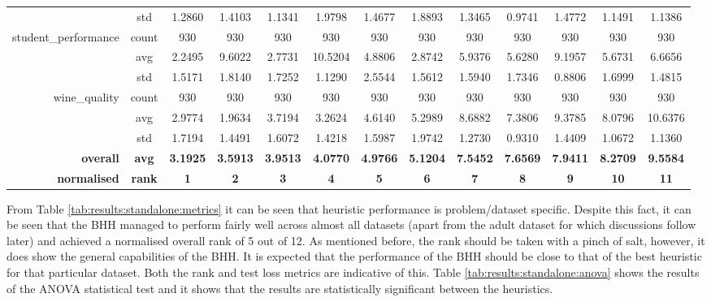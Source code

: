 \begin{table}[htbp]
{\begin{tabular}{rcccccccccccc}
          & std   & 1.2860 & 1.4103 & 1.1341 & 1.9798 & 1.4677 & 1.8893 & 1.3465 & 0.9741 & 1.4772 & 1.1491 & 1.1386 \\
    student\_performance & count & 930   & 930   & 930   & 930   & 930   & 930   & 930   & 930   & 930   & 930   & 930 \\
          & avg   & \cellcolor[rgb]{ .776,  .937,  .808}\textcolor[rgb]{ 0,  .38,  0}{2.2495} & 9.6022 & 2.7731 & 10.5204 & 4.8806 & 2.8742 & 5.9376 & 5.6280 & 9.1957 & 5.6731 & 6.6656 \\
          & std   & 1.5171 & 1.8140 & 1.7252 & 1.1290 & 2.5544 & 1.5612 & 1.5940 & 1.7346 & 0.8806 & 1.6999 & 1.4815 \\
    wine\_quality & count & 930   & 930   & 930   & 930   & 930   & 930   & 930   & 930   & 930   & 930   & 930 \\
          & avg   & 2.9774 & \cellcolor[rgb]{ .776,  .937,  .808}\textcolor[rgb]{ 0,  .38,  0}{1.9634} & 3.7194 & 3.2624 & 4.6140 & 5.2989 & 8.6882 & 7.3806 & 9.3785 & 8.0796 & 10.6376 \\
          & std   & 1.7194 & 1.4491 & 1.6072 & 1.4218 & 1.5987 & 1.9742 & 1.2730 & 0.9310 & 1.4409 & 1.0672 & 1.1360 \\
    \midrule
    \textbf{overall} & \textbf{avg} & \cellcolor[rgb]{ .776,  .937,  .808}\textcolor[rgb]{ 0,  .38,  0}{\textbf{3.1925}} & \textbf{3.5913} & \textbf{3.9513} & \textbf{4.0770} & \textbf{4.9766} & \textbf{5.1204} & \textbf{7.5452} & \textbf{7.6569} & \textbf{7.9411} & \textbf{8.2709} & \textbf{9.5584} \\
    \textbf{normalised} & \textbf{rank} & \cellcolor[rgb]{ .388,  .745,  .482}\textbf{1} & \cellcolor[rgb]{ .51,  .78,  .486}\textbf{2} & \cellcolor[rgb]{ .631,  .816,  .494}\textbf{3} & \cellcolor[rgb]{ .753,  .851,  .502}\textbf{4} & \cellcolor[rgb]{ .875,  .886,  .51}\textbf{5} & \cellcolor[rgb]{ 1,  .922,  .518}\textbf{6} & \cellcolor[rgb]{ .996,  .824,  .502}\textbf{7} & \cellcolor[rgb]{ .992,  .722,  .482}\textbf{8} & \cellcolor[rgb]{ .984,  .616,  .459}\textbf{9} & \cellcolor[rgb]{ .98,  .514,  .439}\textbf{10} & \cellcolor[rgb]{ .973,  .412,  .42}\textbf{11} \\
    \end{tabular}%
    }
\end{table}%

From Table \ref{tab:results:standalone:metrics} it can be seen that heuristic performance is problem/dataset specific. Despite this fact, it can be seen that the \Ac{BHH} managed to perform fairly well across almost all datasets (apart from the adult dataset for which discussions follow later) and achieved a normalised overall rank of 5 out of 12. As mentioned before, the rank should be taken with a pinch of salt, however, it does show the general capabilities of the \Ac{BHH}. It is expected that the performance of the \Ac{BHH} should be close to that of the best heuristic for that particular dataset. Both the rank and test loss metrics are indicative of this. Table \ref{tab:results:standalone:anova} shows the results of the ANOVA statistical test and it shows that the results are statistically significant between the heuristics.


